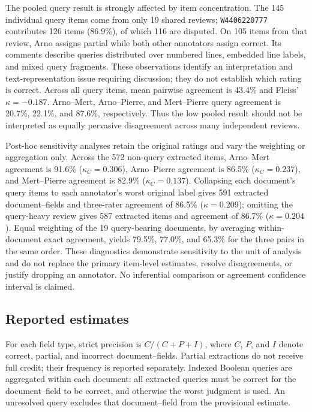 

The pooled query result is strongly affected by item concentration. The 145 individual query items come from only 19 shared reviews; \texttt{W4406220777} contributes 126 items (86.9\%), of which 116 are disputed. On 105 items from that review, Arno assigns partial while both other annotators assign correct. Its comments describe queries distributed over numbered lines, embedded line labels, and mixed query fragments. These observations identify an interpretation and text-representation issue requiring discussion; they do not establish which rating is correct. Across all query items, mean pairwise agreement is 43.4\% and Fleiss'~$\kappa=-0.187$. Arno--Mert, Arno--Pierre, and Mert--Pierre query agreement is 20.7\%, 22.1\%, and 87.6\%, respectively. Thus the low pooled result should not be interpreted as equally pervasive disagreement across many independent reviews.

Post-hoc sensitivity analyses retain the original ratings and vary the weighting or aggregation only. Across the 572 non-query extracted items, Arno--Mert agreement is 91.6\% ($\kappa_C=0.306$), Arno--Pierre agreement is 86.5\% ($\kappa_C=0.237$), and Mert--Pierre agreement is 82.9\% ($\kappa_C=0.137$). Collapsing each document's query items to each annotator's worst original label gives 591 extracted document--fields and three-rater agreement of 86.5\% ($\kappa=0.209$); omitting the query-heavy review gives 587 extracted items and agreement of 86.7\% ($\kappa=0.204$). Equal weighting of the 19 query-bearing documents, by averaging within-document exact agreement, yields 79.5\%, 77.0\%, and 65.3\% for the three pairs in the same order. These diagnostics demonstrate sensitivity to the unit of analysis and do not replace the primary item-level estimates, resolve disagreements, or justify dropping an annotator. No inferential comparison or agreement confidence interval is claimed.

\subsection*{Reported estimates}
For each field type, strict precision is $C/(C+P+I)$, where $C$, $P$, and $I$ denote correct, partial, and incorrect document--fields. Partial extractions do not receive full credit; their frequency is reported separately. Indexed Boolean queries are aggregated within each document: all extracted queries must be correct for the document--field to be correct, and otherwise the worst judgment is used. An unresolved query excludes that document--field from the provisional estimate.

